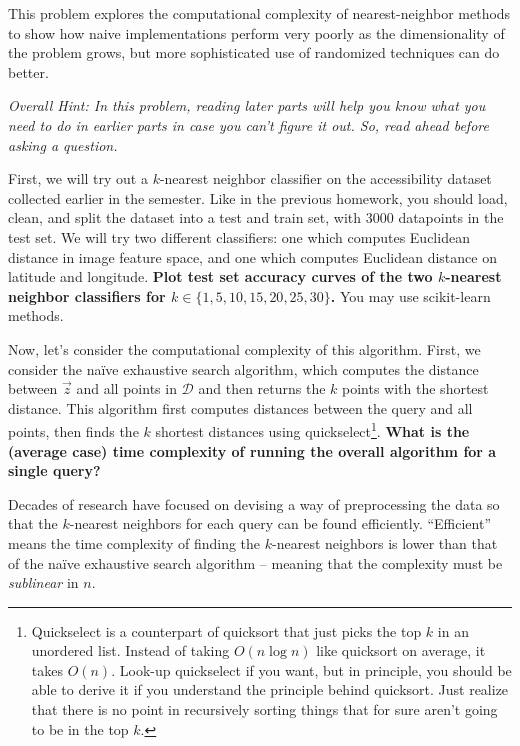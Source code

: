 \documentclass[preview]{standalone}
\begin{document}
This problem explores the computational complexity of nearest-neighbor methods to show how naive implementations perform very poorly as the dimensionality of the problem grows, but more sophisticated use of randomized techniques can do better. 

{\em Overall Hint: In this problem, reading later parts will help you know what you need to do in earlier parts in case you can't figure it out. So, read ahead before asking a question.}

\begin{Parts}
\Part First, we will try out a $k$-nearest neighbor classifier on the accessibility dataset collected earlier in the semester. Like in the previous homework, you should load, clean, and split the dataset into a test and train set, with 3000 datapoints in the test set. We will try two different classifiers: one which computes Euclidean distance in image feature space, and one which computes Euclidean distance on latitude and longitude. {\bf Plot test set accuracy curves of the two $k$-nearest neighbor classifiers for $k\in\{1, 5, 10, 15, 20, 25, 30\}$. } You may use scikit-learn methods.



\Part Now, let's consider the computational complexity of this algorithm. First, we consider the na\"{i}ve exhaustive search algorithm, which computes the distance between $\vec{z}$ and all points in $\mathcal{D}$ and then returns the $k$ points with the shortest distance. 
This algorithm first computes distances between the query and all points, then finds the $k$ shortest distances using quickselect\footnote{
Quickselect is a counterpart of quicksort that just picks the top $k$ in an unordered list. Instead of taking $O(n \log n)$ like quicksort on average, it takes $O(n)$. Look-up quickselect if you want, but in principle, you should be able to derive it if you understand the principle behind quicksort. Just realize that there is no point in recursively sorting things that for sure aren't going to be in the top $k$.}.
{\bf What is the (average case) time complexity of running the overall algorithm for a single query?} 



\Part Decades of research have focused on devising a way of preprocessing the data so that the $k$-nearest neighbors for each query can be found efficiently. ``Efficient'' means the time complexity of finding the $k$-nearest neighbors is lower than that of the na\"{i}ve exhaustive search algorithm -- meaning that the complexity must be \emph{sublinear} in $n$.


\end{Parts}
\end{document}
